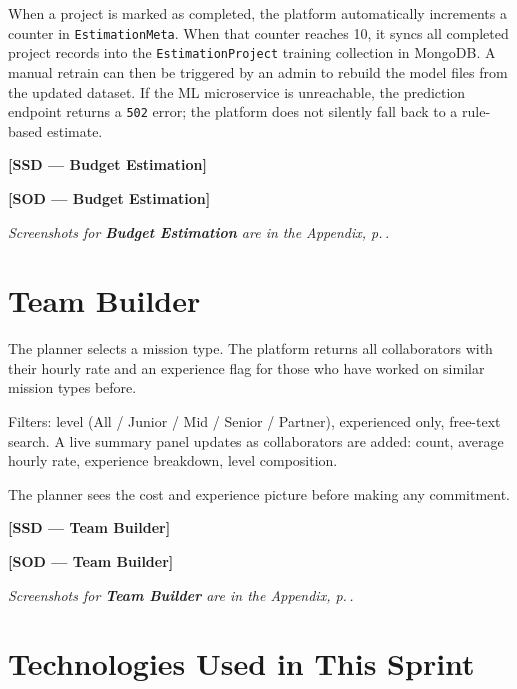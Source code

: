 \documentclass[12pt,a4paper]{report}
\newcommand{\ssd}[1]{\begin{placeholder}\textbf{[SSD --- #1]}\end{placeholder}\vspace{2pt}}
\newcommand{\sod}[1]{\begin{placeholder}\textbf{[SOD --- #1]}\end{placeholder}\vspace{4pt}}
\newcommand{\annexref}[1]{\begin{screenshotbox}\small\textit{Screenshots for \textbf{#1} are in the Appendix, p.\,\pageref{annex:#1}.}\end{screenshotbox}\vspace{4pt}}
\begin{document}
When a project is marked as completed, the platform automatically increments a
counter in \texttt{EstimationMeta}. When that counter reaches 10, it syncs all
completed project records into the \texttt{EstimationProject} training collection
in MongoDB. A manual retrain can then be triggered by an admin to rebuild the
model files from the updated dataset. If the ML microservice is unreachable, the
prediction endpoint returns a \texttt{502} error; the platform does not silently
fall back to a rule-based estimate.

\ssd{Budget Estimation}
\sod{Budget Estimation}
\annexref{Budget Estimation}

\section{Team Builder}

The planner selects a mission type. The platform returns all collaborators with their
hourly rate and an experience flag for those who have worked on similar mission types
before.

Filters: level (All / Junior / Mid / Senior / Partner), experienced only, free-text
search. A live summary panel updates as collaborators are added: count, average hourly
rate, experience breakdown, level composition.

The planner sees the cost and experience picture before making any commitment.

\ssd{Team Builder}
\sod{Team Builder}
\annexref{Team Builder}

\section{Technologies Used in This Sprint}
\end{document}
